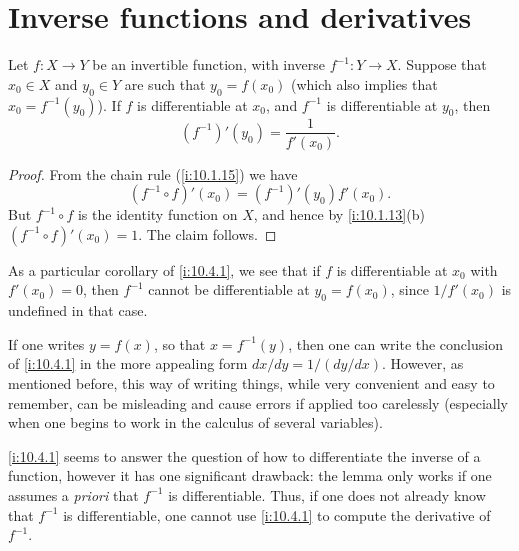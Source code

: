 \section{Inverse functions and derivatives}\label{i:sec:10.4}

\begin{lem}\label{i:10.4.1}
  Let \(f : X \to Y\) be an invertible function, with inverse \(f^{-1} : Y \to X\).
  Suppose that \(x_0 \in X\) and \(y_0 \in Y\) are such that \(y_0 = f(x_0)\)
  (which also implies that \(x_0 = f^{-1}(y_0)\)).
  If \(f\) is differentiable at \(x_0\), and \(f^{-1}\) is differentiable at \(y_0\), then
  \[
    (f^{-1})'(y_0) = \dfrac{1}{f'(x_0)}.
  \]
\end{lem}

\begin{proof}
  From the chain rule (\cref{i:10.1.15}) we have
  \[
    (f^{-1} \circ f)'(x_0) = (f^{-1})'(y_0) f'(x_0).
  \]
  But \(f^{-1} \circ f\) is the identity function on \(X\), and hence by \cref{i:10.1.13}(b) \((f^{-1} \circ f)'(x_0) = 1\).
  The claim follows.
\end{proof}

\begin{note}
  As a particular corollary of \cref{i:10.4.1}, we see that if \(f\) is differentiable at \(x_0\) with \(f'(x_0) = 0\), then \(f^{-1}\) cannot be differentiable at \(y_0 = f(x_0)\), since \(1 / f'(x_0)\) is undefined in that case.
\end{note}

\begin{note}
  If one writes \(y = f(x)\), so that \(x = f^{-1}(y)\), then one can write the conclusion of \cref{i:10.4.1} in the more appealing form \(dx / dy = 1 / (dy / dx)\).
  However, as mentioned before, this way of writing things, while very convenient and easy to remember, can be misleading and cause errors if applied too carelessly (especially when one begins to work in the calculus of several variables).
\end{note}

\begin{note}
  \cref{i:10.4.1} seems to answer the question of how to differentiate the inverse of a function, however it has one significant drawback:
  the lemma only works if one assumes a \emph{priori} that \(f^{-1}\) is differentiable.
  Thus, if one does not already know that \(f^{-1}\) is differentiable, one cannot use \cref{i:10.4.1} to compute the derivative of \(f^{-1}\).
\end{note}

